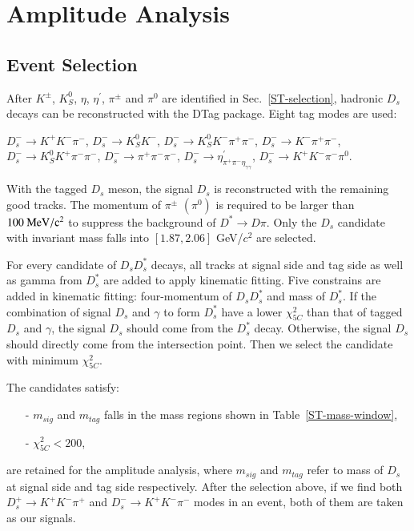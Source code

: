 \section{Amplitude Analysis}
\label{Amplitude-Analysis}
\subsection{Event Selection}
\label{AASelection}
\par{
    After $K^{\pm}$, $K_S^{0}$, $\eta$, $\eta^{'}$, $\pi^{\pm}$ and $\pi^{0}$ are identified in Sec.~\ref{ST-selection}, hadronic $D_{s}$ decays can be reconstructed with the DTag package. 
    Eight tag modes are used:

$D_{s}^{-} \rightarrow K^{+}K^{-}\pi^{-}$, $D_{s}^{-} \rightarrow K_{S}^{0}K^{-}$, $D_{s}^{-} \rightarrow K_{S}^{0}K^{-}\pi^{+}\pi^{-}$, $D_{s}^{-} \rightarrow K^{-}\pi^{+}\pi^{-}$, $D_{s}^{-} \rightarrow K_{S}^{0}K^{+}\pi^{-}\pi^{-}$, $D_{s}^{-} \rightarrow \pi^{+}\pi^{-}\pi^{-}$, $D_{s}^{-} \rightarrow \eta^{'}_{\pi^{+}\pi^{-}\eta_{\gamma\gamma}}$, $D_{s}^{-} \rightarrow K^{+}K^{-}\pi^{-}\pi^{0}$.


With the tagged $D_{s}$ meson, the signal $D_{s}$ is reconstructed with the remaining good tracks. 
The momentum of $\pi^{\pm}$ $(\pi^{0})$ is required to be larger than $100\ {\rm MeV/c^{2}}$ to suppress the background of $D^{*} \rightarrow D\pi$.
Only the $D_{s}$ candidate with invariant mass falls into $[1.87, 2.06]$ GeV/$c^{2}$ are selected.

For every candidate of $D_{s}D_{s}^{*}$ decays, all tracks at signal side and tag side as well as gamma from $D_{s}^{*}$ are added to apply kinematic fitting. 
Five constrains are added in kinematic fitting: four-momentum of $D_{s}D_{s}^{*}$ and mass of $D_{s}^{*}$. 
If the combination of signal $D_{s}$ and $\gamma$ to form $D_{s}^{*}$ have a lower $\chi_{5C}^{2}$ than that of tagged $D_{s}$ and $\gamma$, the signal $D_{s}$ should come from the $D_{s}^{*}$ decay.
Otherwise, the signal $D_{s}$ should directly come from the intersection point.
Then we select the candidate with minimum $\chi_{5C}^{2}$.  

The candidates satisfy:
\begin{itemize}
    \item[-] $m_{sig}$ and $m_{tag}$ falls in the mass regions shown in Table~\ref{ST-mass-window}, 
	\item[-] $\chi_{5C}^{2} < 200 $, 
\end{itemize}
are retained for the amplitude analysis, where $m_{sig}$ and $m_{tag}$ refer to mass of $D_{s}$ at signal side and tag side respectively.
After the selection above, if we find both $D_{s}^{+} \rightarrow K^{+}K^{-}\pi^{+}$ and $D_{s}^{-} \rightarrow K^{+}K^{-}\pi^{-}$ modes in an event, both of them are taken as our signals.

}
